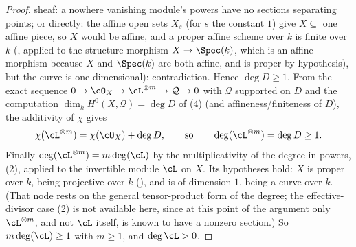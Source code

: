 \begin{proof}
sheaf: a nowhere vanishing module's powers have no sections separating
points; or directly: the affine open sets $X_s$ (for $s$ the constant
$1$) give $X\subseteq$ one affine piece, so $X$ would be affine, and
a proper affine scheme over $k$ is finite over $k$
(, applied to the structure morphism
$X\to\Spec(k)$, which is an affine morphism because $X$ and $\Spec(k)$
are both affine, and is proper by hypothesis), but the curve is
one-dimensional): contradiction.  Hence $\deg D\ge1$.  From the exact
sequence $0\to\cO_X\to\cL^{\otimes m}\to\mathcal Q\to0$ with
$\mathcal Q$ supported on $D$ and the computation
$\dim_kH^0(X,\mathcal Q)=\deg D$ of (4) (and
affineness/finiteness of $D$), the additivity of $\chi$ gives
\[
\chi(\cL^{\otimes m})=\chi(\cO_X)+\deg D,\qquad
\text{so}\qquad
\deg(\cL^{\otimes m})=\deg D\ge1.
\]
Finally $\deg(\cL^{\otimes m})=m\deg(\cL)$ by the multiplicativity of the
degree in powers, (2), applied to the
invertible module $\cL$ on $X$.  Its hypotheses hold: $X$ is proper over
$k$, being projective over $k$ (), and is
of dimension $1$, being a curve over $k$.  (That node rests on the
general tensor-product form of the degree; the effective-divisor case
(2) is not available here, since at this
point of the argument only $\cL^{\otimes m}$, and not $\cL$ itself, is
known to have a nonzero section.)  So $m\deg(\cL)\ge1$ with $m\ge1$, and
$\deg\cL>0$.


\end{proof}
